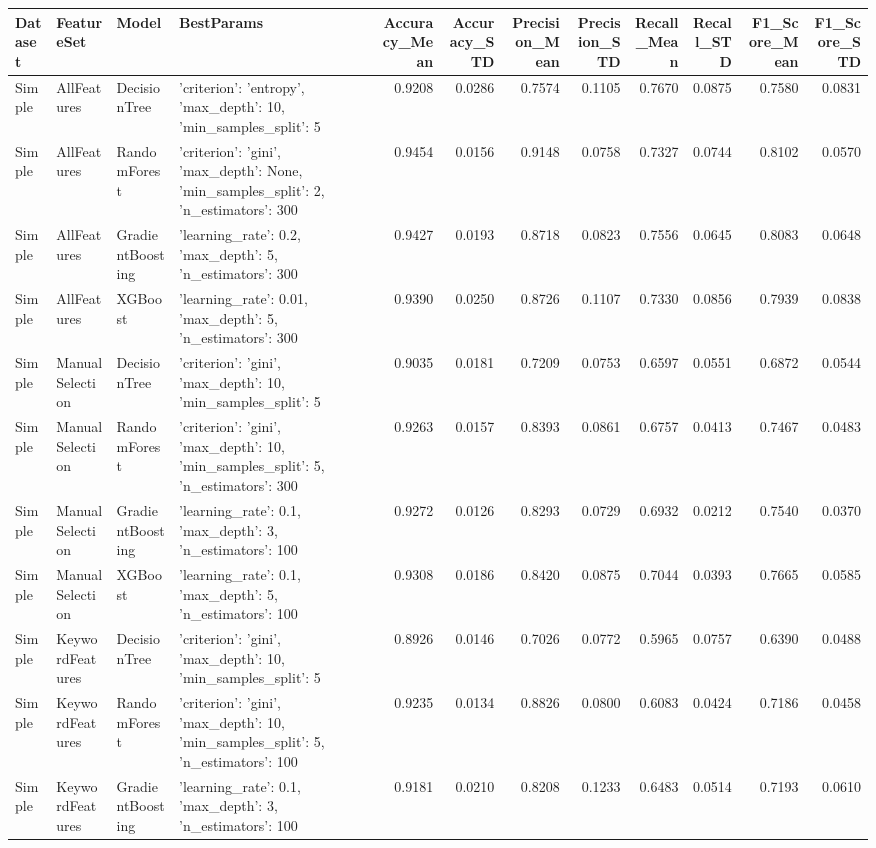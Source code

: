 \begin{tabular}{llllrrrrrrrr}
\toprule
Dataset & FeatureSet & Model & BestParams & Accuracy_Mean & Accuracy_STD & Precision_Mean & Precision_STD & Recall_Mean & Recall_STD & F1_Score_Mean & F1_Score_STD \\
\midrule
Simple & AllFeatures & DecisionTree & {'criterion': 'entropy', 'max_depth': 10, 'min_samples_split': 5} & 0.9208 & 0.0286 & 0.7574 & 0.1105 & 0.7670 & 0.0875 & 0.7580 & 0.0831 \\
Simple & AllFeatures & RandomForest & {'criterion': 'gini', 'max_depth': None, 'min_samples_split': 2, 'n_estimators': 300} & 0.9454 & 0.0156 & 0.9148 & 0.0758 & 0.7327 & 0.0744 & 0.8102 & 0.0570 \\
Simple & AllFeatures & GradientBoosting & {'learning_rate': 0.2, 'max_depth': 5, 'n_estimators': 300} & 0.9427 & 0.0193 & 0.8718 & 0.0823 & 0.7556 & 0.0645 & 0.8083 & 0.0648 \\
Simple & AllFeatures & XGBoost & {'learning_rate': 0.01, 'max_depth': 5, 'n_estimators': 300} & 0.9390 & 0.0250 & 0.8726 & 0.1107 & 0.7330 & 0.0856 & 0.7939 & 0.0838 \\
Simple & ManualSelection & DecisionTree & {'criterion': 'gini', 'max_depth': 10, 'min_samples_split': 5} & 0.9035 & 0.0181 & 0.7209 & 0.0753 & 0.6597 & 0.0551 & 0.6872 & 0.0544 \\
Simple & ManualSelection & RandomForest & {'criterion': 'gini', 'max_depth': 10, 'min_samples_split': 5, 'n_estimators': 300} & 0.9263 & 0.0157 & 0.8393 & 0.0861 & 0.6757 & 0.0413 & 0.7467 & 0.0483 \\
Simple & ManualSelection & GradientBoosting & {'learning_rate': 0.1, 'max_depth': 3, 'n_estimators': 100} & 0.9272 & 0.0126 & 0.8293 & 0.0729 & 0.6932 & 0.0212 & 0.7540 & 0.0370 \\
Simple & ManualSelection & XGBoost & {'learning_rate': 0.1, 'max_depth': 5, 'n_estimators': 100} & 0.9308 & 0.0186 & 0.8420 & 0.0875 & 0.7044 & 0.0393 & 0.7665 & 0.0585 \\
Simple & KeywordFeatures & DecisionTree & {'criterion': 'gini', 'max_depth': 10, 'min_samples_split': 5} & 0.8926 & 0.0146 & 0.7026 & 0.0772 & 0.5965 & 0.0757 & 0.6390 & 0.0488 \\
Simple & KeywordFeatures & RandomForest & {'criterion': 'gini', 'max_depth': 10, 'min_samples_split': 5, 'n_estimators': 100} & 0.9235 & 0.0134 & 0.8826 & 0.0800 & 0.6083 & 0.0424 & 0.7186 & 0.0458 \\
Simple & KeywordFeatures & GradientBoosting & {'learning_rate': 0.1, 'max_depth': 3, 'n_estimators': 100} & 0.9181 & 0.0210 & 0.8208 & 0.1233 & 0.6483 & 0.0514 & 0.7193 & 0.0610 \\

\end{tabular}

